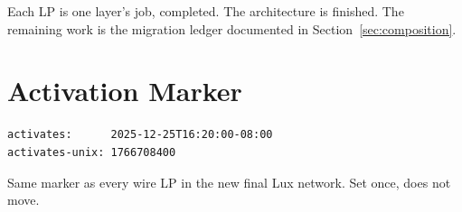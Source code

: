 Each LP is one layer's job, completed. The architecture is finished.
The remaining work is the migration ledger documented in
Section~\ref{sec:composition}.

\section{Activation Marker}

\begin{verbatim}
activates:      2025-12-25T16:20:00-08:00
activates-unix: 1766708400
\end{verbatim}

Same marker as every wire LP in the new final Lux network. Set once,
does not move.
